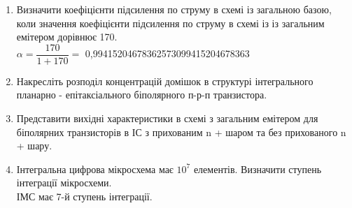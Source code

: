 \documentclass[a4paper,14pt]{extreport}
\begin{document}
\begin{enumerate}
\item Визначити коефіцієнти підсилення по струму в схемі із загальною базою, коли значення коефіцієнти підсилення по струму в схемі із із загальним емітером дорівнює 170.\\

$\alpha = \dfrac{170}{1+170} = $ 0,99415204678362573099415204678363\\
\newpage

\item Накресліть розподіл концентрацій домішок в структурі інтегрального планарно - епітаксіального біполярного п-р-п транзистора.\par


\begin{figure}[h!]
\end{figure}


\item  Представити вихідні характеристики в схемі з загальним емітером для біполярних транзисторів в ІС з прихованим n + шаром та без прихованого
n + шару.\par

\begin{figure}[h!]
\end{figure}

\item Інтегральна цифрова мікросхема має $10^7$
елементів. Визначити ступень інтеграції мікросхеми.\\

ІМС має 7-й ступень інтеграції.
      \end{enumerate}
\end{document}
